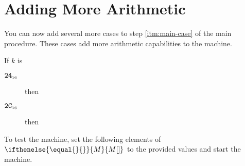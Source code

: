 \documentclass[a4paper,12pt]{article}
\newcommand{\num}[1]{\texttt{#1}}
\newcommand{\hex}[1]{\num{#1}_{\textup{\tiny 16}}}
\newcommand{\MEM}[1]{\ifthenelse{\equal{#1}{}}{M}{M[#1]}}
\newcommand{\proc}[1]{\textsc{#1}}
\newcommand{\op}[1]{$#1$}
\newcommand{\LT}        [1]{\op{\hex{24}}}
\newcommand{\POW}       [1]{\op{\hex{2C}}}
\begin{document}
\section{Adding More Arithmetic}

You can now add several more cases to step \ref{itm:main-case} of the main procedure.
These cases add more arithmetic capabilities to the machine.

\begin{stepnumbers}[start=3]
\item If $k$ is
  \begin{description}
  \item[\LT{}] then
  \item[\POW{}] then
  \end{description}
\end{stepnumbers}
To test the machine, set the following elements of $\MEM{}$ to the provided values and start the machine.
\end{document}
